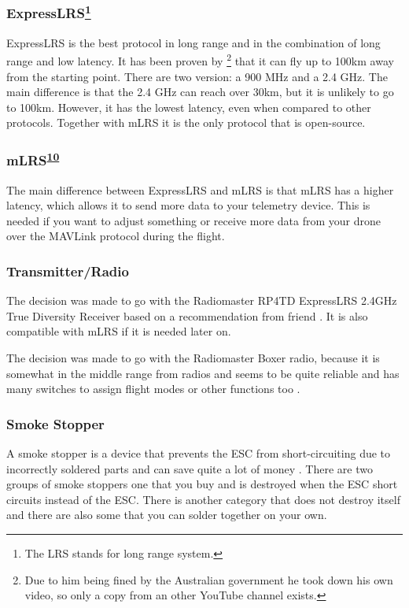 \documentclass[svgnames]{article}
\begin{document}
	\subsubsection*{ExpressLRS\protect\footnote{The LRS stands for long range system.}}
	ExpressLRS is the best protocol in long range and in the combination of long range and low latency. It has been proven by \textcite{elrswezley}\footnote{Due to him being fined by the Australian government he took down his own video, so only a copy from an other YouTube channel exists.} that it can fly up to 100km away from the starting point. There are two version: a 900 MHz and a 2.4 GHz. The main difference is that the 2.4 GHz can reach over 30km, but it is unlikely to go to 100km. However, it has the lowest latency, even when compared to other protocols. Together with mLRS it is the only protocol that is open-source.
	\subsubsection*{mLRS\textsuperscript{\hyperlink{footnote10}{10}}}
	The main difference between ExpressLRS and mLRS is that mLRS has a higher latency, which allows it to send more data to your telemetry device. This is needed if you want to adjust something or receive more data from your drone over the MAVLink protocol during the flight. 
	
	\subsubsection*{Transmitter/Radio}
	The decision was made to go with the Radiomaster RP4TD ExpressLRS 2.4GHz True Diversity Receiver based on a recommendation from friend \cite{radiomasterreceiver}. It is also compatible with mLRS if it is needed later on.
	
	The decision was made to go with the Radiomaster Boxer radio, because it is somewhat in the middle range from radios and seems to be quite reliable and has many switches to assign flight modes or other functions too  \cite{radiomasterboxer}. 

	\subsubsection{Smoke Stopper}
	A smoke stopper is a device that prevents the ESC from short-circuiting due to incorrectly soldered parts and can save quite a lot of money  \cite{smokestopper}. There are two groups of smoke stoppers one that you buy and is destroyed when the ESC short circuits instead of the ESC. There is another category that does not destroy itself and there are also some that you can solder together on your own. 
	
\end{document}
